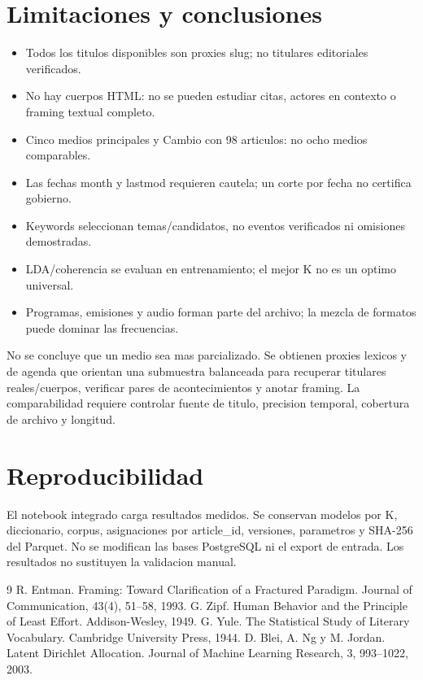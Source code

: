 \documentclass[10pt,twocolumn]{article}
\begin{document}
\section{Limitaciones y conclusiones}
\begin{itemize}
\item Todos los titulos disponibles son proxies slug; no titulares editoriales verificados.
\item No hay cuerpos HTML: no se pueden estudiar citas, actores en contexto o framing textual completo.
\item Cinco medios principales y Cambio con 98 articulos: no ocho medios comparables.
\item Las fechas month y lastmod requieren cautela; un corte por fecha no certifica gobierno.
\item Keywords seleccionan temas/candidatos, no eventos verificados ni omisiones demostradas.
\item LDA/coherencia se evaluan en entrenamiento; el mejor K no es un optimo universal.
\item Programas, emisiones y audio forman parte del archivo; la mezcla de formatos puede dominar las frecuencias.
\end{itemize}
No se concluye que un medio sea mas parcializado. Se obtienen proxies lexicos y de agenda que orientan una submuestra balanceada para recuperar titulares reales/cuerpos, verificar pares de acontecimientos y anotar framing. La comparabilidad requiere controlar fuente de titulo, precision temporal, cobertura de archivo y longitud.
\section{Reproducibilidad}
El notebook integrado carga resultados medidos. Se conservan modelos por K, diccionario, corpus, asignaciones por article\_id, versiones, parametros y SHA-256 del Parquet. No se modifican las bases PostgreSQL ni el export de entrada. Los resultados no sustituyen la validacion manual.
\begin{thebibliography}{9}
 R. Entman. Framing: Toward Clarification of a Fractured Paradigm. Journal of Communication, 43(4), 51--58, 1993.
 G. Zipf. Human Behavior and the Principle of Least Effort. Addison-Wesley, 1949.
 G. Yule. The Statistical Study of Literary Vocabulary. Cambridge University Press, 1944.
 D. Blei, A. Ng y M. Jordan. Latent Dirichlet Allocation. Journal of Machine Learning Research, 3, 993--1022, 2003.
\end{thebibliography}
\end{document}
